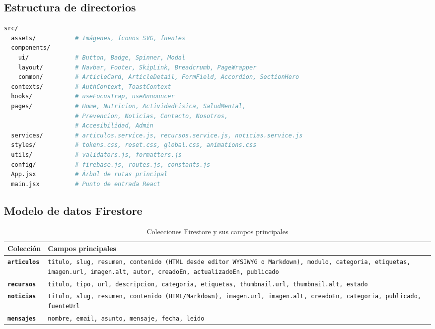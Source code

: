 \documentclass[12pt, a4paper]{article}
\begin{document}
\subsection{Estructura de directorios}

\begin{lstlisting}[language=bash, caption={Árbol de directorios de \texttt{src/}}]
src/
  assets/           # Imágenes, íconos SVG, fuentes
  components/
    ui/             # Button, Badge, Spinner, Modal
    layout/         # Navbar, Footer, SkipLink, Breadcrumb, PageWrapper
    common/         # ArticleCard, ArticleDetail, FormField, Accordion, SectionHero
  contexts/         # AuthContext, ToastContext
  hooks/            # useFocusTrap, useAnnouncer
  pages/            # Home, Nutricion, ActividadFisica, SaludMental,
                    # Prevencion, Noticias, Contacto, Nosotros,
                    # Accesibilidad, Admin
  services/         # articulos.service.js, recursos.service.js, noticias.service.js
  styles/           # tokens.css, reset.css, global.css, animations.css
  utils/            # validators.js, formatters.js
  config/           # firebase.js, routes.js, constants.js
  App.jsx           # Árbol de rutas principal
  main.jsx          # Punto de entrada React
\end{lstlisting}

\subsection{Modelo de datos Firestore}

\begin{table}[H]
\centering
\caption{Colecciones Firestore y sus campos principales}
\begin{tabular}{@{}>{\bfseries}p{2.5cm} p{11cm}@{}}
\toprule
\rowcolor{royalblue!12}
\textbf{Colección} & \textbf{Campos principales} \\
\midrule
\texttt{articulos} & \texttt{titulo, slug, resumen, contenido (HTML desde editor WYSIWYG o Markdown), modulo, categoria, etiquetas, imagen.url, imagen.alt, autor, creadoEn, actualizadoEn, publicado} \\
\texttt{recursos} & \texttt{titulo, tipo, url, descripcion, categoria, etiquetas, thumbnail.url, thumbnail.alt, estado} \\
\texttt{noticias} & \texttt{titulo, slug, resumen, contenido (HTML/Markdown), imagen.url, imagen.alt, creadoEn, categoria, publicado, fuenteUrl} \\
\texttt{mensajes} & \texttt{nombre, email, asunto, mensaje, fecha, leido} \\
\bottomrule
\end{tabular}
\end{table}
\end{document}
